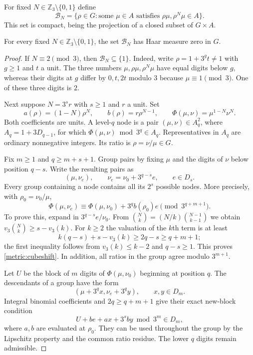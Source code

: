 For fixed $N\in\mathbb Z_3\setminus\{0,1\}$ define
\[
 \mathcal B_N=\{\rho\in G:\text{some }\mu\in A\text{ satisfies }
                           \rho\mu,\rho^N\mu\in A\}.
\]
This set is compact, being the projection of a closed subset of
$G\times A$.

\begin{proposition}\label{metric:fixedratio}
For every fixed $N\in\mathbb Z_3\setminus\{0,1\}$, the set
$\mathcal B_N$ has Haar measure zero in $G$.
\end{proposition}

\begin{proof}
If $N\equiv2\pmod3$, then $\mathcal B_N\subseteq\{1\}$.
Indeed, write $\rho=1+3^g t\ne1$ with $g\geq1$ and $t$ a unit.
The three numbers $\mu,\rho\mu,\rho^N\mu$ have equal digits below
$g$, whereas their digits at $g$ differ by $0,t,2t$ modulo $3$
because $\mu\equiv1\pmod3$. One of these three digits is $2$.

Next suppose $N=3^s r$ with $s\geq1$ and $r$ a unit. Set
\begin{equation}\label{metric:coefficients}
 a(\rho)=(1-N)\rho^N,\qquad b(\rho)=r\rho^{N-1},\qquad
 \Phi(\mu,\nu)=\mu^{1-N}\nu^N.
\end{equation}
Both coefficients are units. A level-$q$ node is a pair
$(\mu,\nu)\in A_q^2$, where $A_q=1+3D_{q-1}$, for which
$\Phi(\mu,\nu)\bmod3^q\in A_q$. Representatives in $A_q$ are
ordinary nonnegative integers. Its ratio is $\rho=\nu/\mu\in G$.

Fix $m\geq1$ and $q\geq m+s+1$. Group pairs by fixing $\mu$ and
the digits of $\nu$ below position $q-s$. Write the resulting pairs as
\[
            (\mu,\nu_e),\qquad
            \nu_e=\nu_0+3^{q-s}e,\qquad e\in D_s.
\]
Every group containing a node contains all its $2^s$ possible nodes.
More precisely, with $\rho_0=\nu_0/\mu$,
\begin{equation}\label{metric:cubeshift}
 \Phi(\mu,\nu_e)\equiv\Phi(\mu,\nu_0)
               +3^q b(\rho_0)e\pmod{3^{q+m+1}}.
\end{equation}
To prove this, expand in $3^{q-s}e/\nu_0$. From
$\binom Nk=(N/k)\binom{N-1}{k-1}$ we obtain
$v_3\binom Nk\geq s-v_3(k)$. For $k\geq2$ the valuation of the
$k$th term is at least
\[
 k(q-s)+s-v_3(k)\geq2q-s\geq q+m+1;
\]
the first inequality follows from $v_3(k)\leq k-2$ and $q-s\geq1$.
This proves \eqref{metric:cubeshift}. In addition, all ratios in the
group agree modulo $3^{m+1}$.

Let $U$ be the block of $m$ digits of $\Phi(\mu,\nu_0)$ beginning
at position $q$. The descendants of a group have the form
\[
                     (\mu+3^q x,\nu_e+3^q y),\qquad x,y\in D_m.
\]
Integral binomial coefficients and $2q\geq q+m+1$ give their exact
new-block condition
\begin{equation}\label{metric:cubelinear}
              U+be+ax+3^sby\bmod3^m\in D_m,
\end{equation}
where $a,b$ are evaluated at $\rho_0$. They can be used throughout
the group by the Lipschitz property and the common ratio residue.
The lower $q$ digits remain admissible.


\end{proof}
